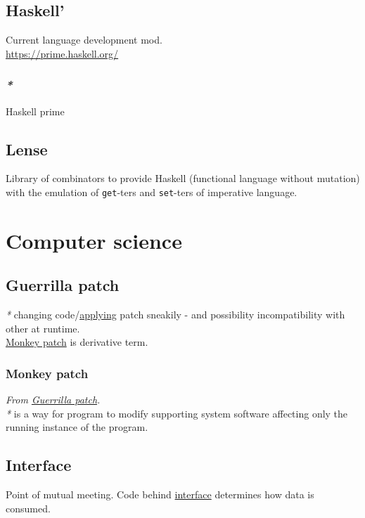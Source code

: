 \documentclass[a4paper,14pt,oneside]{book}
\begin{document}
{\section{\label{orgb2aa18b}Haskell'}
\label{sec:org5ec3ca2}
Current language development mod.\\

\url{https://prime.haskell.org/}\\

\subsection{\emph{*}}
\label{sec:org89b703d}

\label{org1b3614b}Haskell prime\\

\section{\label{org17aa7ce}Lense}
\label{sec:orgfa2630d}
Library of combinators to provide Haskell (functional language without mutation) with the emulation of \texttt{get}-ters and \texttt{set}-ters of imperative language.\\

\chapter{Computer science}
\label{sec:orga3d7bc3}
\section{\label{org5f0bf35}Guerrilla patch}
\label{sec:orgfaa5838}
\emph{*} changing code/\hyperref[org22a10af]{applying} patch sneakily - and possibility incompatibility with other at runtime.\\
\hyperref[org689bddd]{Monkey patch} is derivative term.\\

\subsection{\label{org689bddd}Monkey patch}
\label{sec:org2bb6ddd}
\emph{From \hyperref[org5f0bf35]{Guerrilla patch}.}\\

\emph{*} is a way for program to modify supporting system software affecting only the running instance of the program.\\

\section{\label{org85b498a}Interface}
\label{sec:org0a2f516}
Point of mutual meeting. Code behind \hyperref[org85b498a]{interface} determines how data is consumed.\\

}
\end{document}
